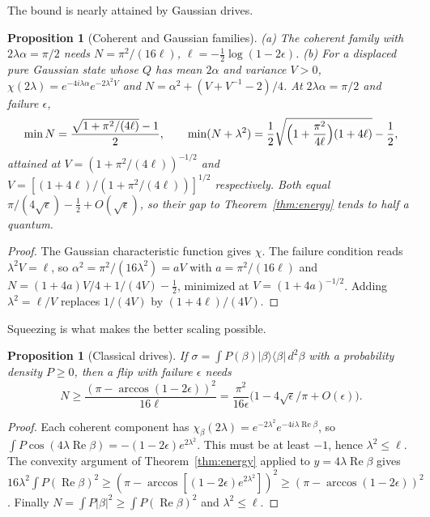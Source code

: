\documentclass[aps,pre,onecolumn,superscriptaddress,floatfix,longbibliography]{revtex4-2}
\newtheorem{proposition}[theorem]{Proposition}
\begin{document}
The bound is nearly attained by Gaussian drives.

\begin{proposition}[Coherent and Gaussian families]
\label{prop:gauss}
(a) The coherent family with $2\lambda\alpha=\pi/2$ needs $N=\pi^2/(16\ell)$, $\ell=-\tfrac12\log(1-2\epsilon)$.
(b) For a displaced pure Gaussian state whose $Q$ has mean $2\alpha$ and variance $V>0$, $\chi(2\lambda)=e^{-4i\lambda\alpha}e^{-2\lambda^2V}$ and $N=\alpha^2+(V+V^{-1}-2)/4$. At $2\lambda\alpha=\pi/2$ and failure $\epsilon$,
\begin{equation}
\min N=\frac{\sqrt{1+\pi^2/(4\ell)}-1}{2},\qquad
\min(N+\lambda^2)=\frac12\sqrt{\Bigl(1+\frac{\pi^2}{4\ell}\Bigr)(1+4\ell)}-\frac12,
\label{eq:gauss}
\end{equation}
attained at $V=(1+\pi^2/(4\ell))^{-1/2}$ and $V=[(1+4\ell)/(1+\pi^2/(4\ell))]^{1/2}$ respectively. Both equal $\pi/(4\sqrt\epsilon)-\tfrac12+O(\sqrt\epsilon)$, so their gap to Theorem~\ref{thm:energy} tends to half a quantum.
\end{proposition}

\begin{proof}
The Gaussian characteristic function gives $\chi$. The failure condition reads $\lambda^2V=\ell$, so $\alpha^2=\pi^2/(16\lambda^2)=aV$ with $a=\pi^2/(16\ell)$ and $N=(1+4a)V/4+1/(4V)-\tfrac12$, minimized at $V=(1+4a)^{-1/2}$. Adding $\lambda^2=\ell/V$ replaces $1/(4V)$ by $(1+4\ell)/(4V)$.
\end{proof}

Squeezing is what makes the better scaling possible.

\begin{proposition}[Classical drives]
\label{prop:classical}
If $\sigma=\int P(\beta)|\beta\rangle\langle\beta|\,d^2\beta$ with a probability density $P\ge0$, then a flip with failure $\epsilon$ needs
\begin{equation}
N\ge\frac{(\pi-\arccos(1-2\epsilon))^2}{16\ell}=\frac{\pi^2}{16\epsilon}\bigl(1-4\sqrt\epsilon/\pi+O(\epsilon)\bigr).
\label{eq:classical}
\end{equation}
\end{proposition}

\begin{proof}
Each coherent component has $\chi_\beta(2\lambda)=e^{-2\lambda^2}e^{-4i\lambda\operatorname{Re}\beta}$, so $\int P\cos(4\lambda\operatorname{Re}\beta)=-(1-2\epsilon)e^{2\lambda^2}$. This must be at least $-1$, hence $\lambda^2\le\ell$. The convexity argument of Theorem~\ref{thm:energy} applied to $y=4\lambda\operatorname{Re}\beta$ gives $16\lambda^2\int P(\operatorname{Re}\beta)^2\ge(\pi-\arccos[(1-2\epsilon)e^{2\lambda^2}])^2\ge(\pi-\arccos(1-2\epsilon))^2$. Finally $N=\int P|\beta|^2\ge\int P(\operatorname{Re}\beta)^2$ and $\lambda^2\le\ell$.
\end{proof}
\end{document}
